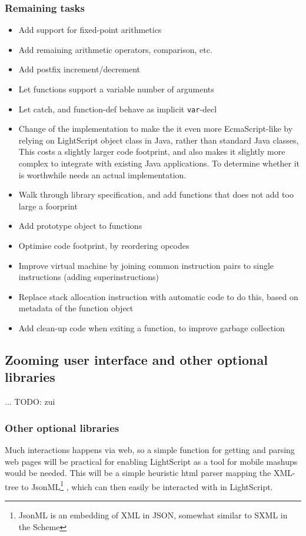 \documentclass[11pt]{report}
\begin{document}
\subsubsection{Remaining tasks}
\begin{itemize}
\item Add support for fixed-point arithmetics
\item Add remaining arithmetic operators, comparison, etc. 
\item Add postfix increment/decrement
\item Let functions support a variable number of arguments
\item Let catch, and function-def behave as implicit \verb|var|-decl
\item Change of the implementation to make the it even more EcmaScript-like by relying on LightScript object class in Java, rather than standard Java classes, This costs a slightly larger code footprint, and also makes it slightly more complex to integrate with existing Java applications.
To determine whether it is worthwhile needs an actual implementation.
\item Walk through library specification, and add functions that does not add too large a foorprint
\item Add prototype object to functions
\item Optimise code footprint, by reordering opcodes
\item Improve virtual machine by joining common instruction pairs to single instructions (adding superinstructions)
\item Replace stack allocation instruction with automatic code to do this, based on metadata of the function object 
\item Add clean-up code when exiting a function, to improve garbage collection
\end{itemize}

\subsection{Zooming user interface and other optional libraries}
... TODO: zui


\subsubsection{Other optional libraries}

Much interactions happens via web, so a simple function for getting and parsing web pages will be practical for enabling LightScript as a tool for mobile mashups would be needed. This will be a simple heuristic html parser mapping the XML-tree to JsonML\footnote{JsonML is an embedding of XML in JSON, somewhat similar to SXML in the Scheme} \cite{jsonml}, which can then easily be interacted with in LightScript.
\end{document}
